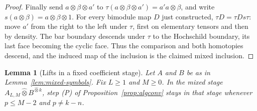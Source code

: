 \documentclass[11pt,oneside,reqno]{article}
\theoremstyle{plain}
\newtheorem{lemma}[theorem]{Lemma}
\theoremstyle{definition}
\theoremstyle{remark}
\begin{document}
\begin{proof}
Finally send \(a\otimes\beta\otimes a'\) to
\(\tau(a\otimes\beta\otimes a')=a'a\otimes\beta\), and write
\(s(a\otimes\beta)=a\otimes\beta\otimes1\). For every
bimodule map \(D\) just constructed, \(\tau D=\tau D s\tau\):
move \(a'\) from the right to the left under \(\tau\), first on
elementary tensors and then by density. The bar boundary descends
under \(\tau\) to the Hochschild boundary, its last face becoming the
cyclic face. Thus the comparison and both homotopies descend, and
the induced map of the inclusion is the claimed mixed inclusion.
\end{proof}

\begin{lemma}[Lifts in a fixed coefficient stage]
\label{lem:mixed-lifts}
Let \(A\) and \(B\) be as in Lemma~\ref{lem:mixed-symbols}.
Fix \(L\geq1\) and \(M\geq0\). In the mixed stage
\(A_{L,M}\widehat\otimes B^{\widehat\otimes k}\), step (P) of
Proposition~\ref{prop:algconv} stays in that stage whenever
\(p\leq M-2\) and \(p\neq k-n\).
\end{lemma}
\end{document}
